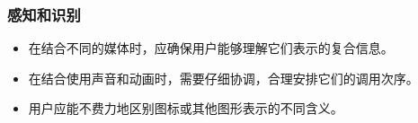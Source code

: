 \documentclass{beamer}
\begin{document}
{
	\begin{frame}[plain]
		\transdissolve
	\end{frame}	
}

\begin{frame}
	\beamertemplatetransparentcovereddynamicmedium
	\frametitle{感知和识别}
	\begin{itemize}[<+->]
		\item 在结合不同的媒体时，应确保用户能够理解它们表示的复合信息。
		\item 在结合使用声音和动画时，需要仔细协调，合理安排它们的调用次序。
		\item 用户应能不费力地区别图标或其他图形表示的不同含义。
	\end{itemize}
\end{frame}
\end{document}
